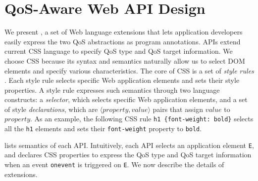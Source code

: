 \section{QoS-Aware Web API Design}
\label{sec:lang:spec}


We present \greenweb, a set of Web language extensions that lets application developers easily express the two QoS abstractions as program annotations. \greenweb APIs extend current CSS language to specify QoS type and QoS target information. We choose CSS because its syntax and semantics naturally allow us to select DOM elements and specify various characteristics. The core of CSS is a set of \textit{style rules} \cite{css21}. Each style rule selects specific Web application elements and sets their style properties. A style rule expresses such semantics through two language constructs: a \textit{selector}, which selects specific Web application elements, and a set of style \textit{declarations}, which are $\langle property, value \rangle$ pairs that assign $value$ to $property$. As an example, the following CSS rule \texttt{h1 \{font-weight: bold\}} selects all the \texttt{h1} elements and sets their \texttt{font-weight} property to \texttt{bold}.


 lists semantics of each \greenweb API. Intuitively, each \greenweb API selects an application element \texttt{E}, and declares CSS properties to express the QoS type and QoS target information when an event \texttt{onevent} is triggered on \texttt{E}. We now describe the details of \greenweb extensions.

